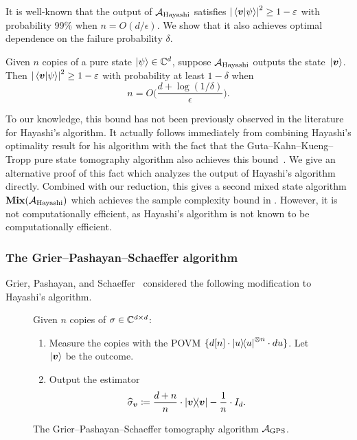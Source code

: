 \documentclass{article}
\newcommand{\mixed}{\textup{\textbf{Mix}}}
\newcommand{\gps}{\calA_{\mathrm{GPS}}}
\newcommand{\hayashi}{\calA_{\mathrm{Hayashi}}}
\begin{document}
It is well-known that the output of $\hayashi$ satisfies $\abs{\braket*{\boldsymbol{v}}{\psi}}^2 \geq 1- \varepsilon$ with probability 99\% when $n = O(d/\epsilon)$.
We show that it also achieves optimal dependence on the failure probability $\delta$.

\begin{proposition} \label{prop:hayashi}
Given $n$ copies of a pure state $\ket{\psi} \in \mathbb C^d$,
suppose $\hayashi$ outputs the state $\ket*{\boldsymbol{v}}$. Then $\abs{\braket*{\boldsymbol{v}}{\psi}}^2 \geq 1 - \varepsilon$ with probability at least $1 - \delta$ when
\begin{equation*}
    n = O\Big(\frac{d + \log(1/\delta)}{\epsilon}\Big).
\end{equation*}
\end{proposition}
\noindent
To our knowledge, this bound has not been previously observed in the literature for Hayashi's algorithm.
It actually follows immediately from combining Hayashi's optimality result for his algorithm with the fact that the Guta--Kahn--Kueng--Tropp pure state tomography algorithm also achieves this bound~\cite[Theorem 5]{GKKT20}.
We give an alternative proof of this fact which analyzes the output of Hayashi's algorithm directly.
Combined with our reduction,
this gives a second mixed state algorithm $\mixed(\hayashi)$ which achieves the sample complexity bound in .
However, it is not computationally efficient,
as Hayashi's algorithm is not known to be computationally efficient.

\subsubsection{The Grier--Pashayan--Schaeffer algorithm}

Grier, Pashayan, and Schaeffer~\cite{GPS24} considered the following modification to Hayashi's algorithm.

{
\begin{figure}[H]
Given $n$ copies of $\sigma \in \mathbb C^{d \times d}$:
\begin{enumerate}
    \item Measure the copies with the POVM $\{d[n] \cdot \ketbra{u}^{\otimes n} \cdot du\}$. Let $\ket{\boldsymbol{v}}$ be the outcome.
    \item Output the estimator
    \begin{equation*}\widehat{\sigma}_{\boldsymbol{v}} \coloneqq \frac{d+n}{n} \cdot \ketbra{\boldsymbol{v}} - \frac{1}{n} \cdot I_d.\end{equation*}
\end{enumerate}
\caption{The Grier--Pashayan--Schaeffer tomography algorithm $\gps$.}
\label{fig:entangled-tomography}
\end{figure}
}
\end{document}
